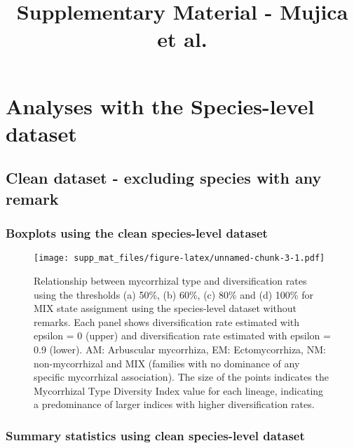 \documentclass[]{article}
\title{Supplementary Material - Mujica et al.}
\author{}
\date{}
\begin{document}
\maketitle

\setcounter{table}{0}  \renewcommand{\thetable}{S\arabic{table}} \setcounter{figure}{0} \renewcommand{\thefigure}{S\arabic{figure}}

\hypertarget{analyses-with-the-species-level-dataset}{%
\section{Analyses with the Species-level
dataset}\label{analyses-with-the-species-level-dataset}}

\hypertarget{clean-dataset---excluding-species-with-any-remark}{%
\subsection{Clean dataset - excluding species with any
remark}\label{clean-dataset---excluding-species-with-any-remark}}

\hypertarget{boxplots-using-the-clean-species-level-dataset}{%
\subsubsection{Boxplots using the clean species-level
dataset}\label{boxplots-using-the-clean-species-level-dataset}}

\begin{figure}
\centering
\texttt{[image: supp\_mat\_files/figure-latex/unnamed-chunk-3-1.pdf]}
\caption{Relationship between mycorrhizal type and diversification rates
using the thresholds (a) 50\%, (b) 60\%, (c) 80\% and (d) 100\% for MIX
state assignment using the species-level dataset without remarks. Each
panel shows diversification rate estimated with epsilon = 0 (upper) and
diversification rate estimated with epsilon = 0.9 (lower). AM:
Arbuscular mycorrhiza, EM: Ectomycorrhiza, NM: non-mycorrhizal and MIX
(families with no dominance of any specific mycorrhizal association).
The size of the points indicates the Mycorrhizal Type Diversity Index
value for each lineage, indicating a predominance of larger indices with
higher diversification rates.}
\end{figure}

\hypertarget{summary-statistics-using-clean-species-level-dataset}{%
\subsubsection{Summary statistics using clean species-level
dataset}\label{summary-statistics-using-clean-species-level-dataset}}
\end{document}
